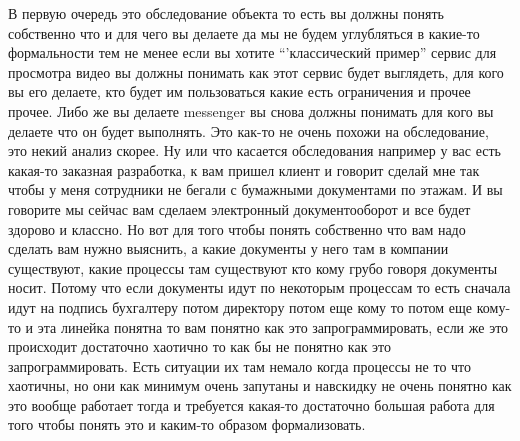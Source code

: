 В первую очередь это обследование объекта то есть
вы должны понять собственно что и для чего вы делаете да мы не будем углубляться в какие-то формальности тем не менее если вы хотите ``'классический пример'' сервис для просмотра видео вы должны понимать как этот сервис будет выглядеть, для кого вы его делаете, кто будет им пользоваться какие есть ограничения и прочее прочее.
Либо же вы делаете messenger вы снова должны понимать для кого вы делаете что он будет выполнять. Это как-то не очень похожи на обследование, это некий анализ скорее.  Ну или что касается обследования например у вас есть какая-то заказная разработка, к вам пришел клиент и говорит сделай мне так чтобы у меня сотрудники не бегали с бумажными документами по этажам. И вы говорите мы сейчас вам сделаем электронный документооборот и все будет здорово и классно. Но вот для того чтобы понять собственно что вам надо сделать вам нужно выяснить, а какие документы у него там в компании существуют, какие процессы там существуют кто кому грубо говоря документы носит. Потому что если документы идут по некоторым процессам то есть сначала идут на подпись бухгалтеру потом директору потом еще кому то потом еще кому-то и эта линейка понятна то вам понятно как это запрограммировать, если же это происходит достаточно хаотично то как бы не понятно как это запрограммировать. Есть ситуации их там немало когда процессы не то что хаотичны, но они как минимум очень запутаны и навскидку не очень понятно как это вообще работает тогда и требуется какая-то достаточно большая работа для того чтобы понять это и каким-то образом формализовать.

